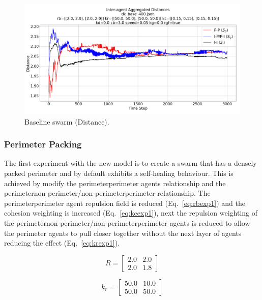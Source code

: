 \documentclass[12pt,a4paper]{IEEEtran}
\newcommand{\kr}{\mathit{k_{r}}}
\newcommand{\rb}{\mathit{R}}
\begin{document}
\begin{figure}[H]
	\begin{center}
		\includegraphics[width=1.0\linewidth]{figures/baselineDistance}
	\end{center}
	\caption{Baseline swarm (Distance). \label{fig:baselineDistance}}
\end{figure}

\subsubsection{Perimeter Packing}\label{sec:perimCompress}

The first experiment with the new model is to create a swarm that has a densely packed perimeter and by default exhibits a self-healing behaviour. This is achieved by modify the perimeter\textrightarrow perimeter agents relationship and the perimeter\textrightarrow non-perimeter/non-perimeter\textrightarrow perimeter relationship. The perimeter\textrightarrow perimeter agent repulsion field is reduced (Eq.~\ref{eq:rbexp1}) and the cohesion weighting is increased (Eq.~\ref{eq:kcexp1}), next the repulsion weighting of the perimeter\textrightarrow non-perimeter/non-perimeter\textrightarrow perimeter agents is reduced to allow the perimeter agents to pull closer together without the next layer of agents reducing the effect (Eq.~\ref{eq:krexp1}). 

\begin{equation}\label{eq:rbexp1}
\rb = 
\begin{bmatrix}
2.0 & 2.0\\
2.0 & 1.8
\end{bmatrix}
\end{equation}

\begin{equation}\label{eq:krexp1}
\kr = 
\begin{bmatrix}
50.0 & 10.0\\
50.0 & 50.0
\end{bmatrix}
\end{equation}
\end{document}
